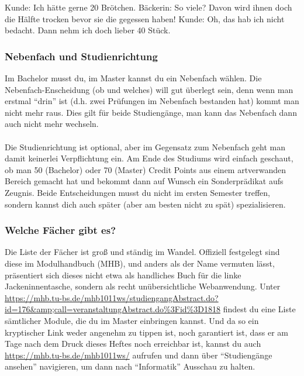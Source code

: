 Kunde: Ich hätte gerne 20 Brötchen. 
Bäckerin: So viele? Davon wird ihnen doch die Hälfte trocken bevor sie die gegessen haben!
Kunde: Oh, das hab ich nicht bedacht. Dann nehm ich doch lieber 40 Stück.

\subsubsection{Nebenfach und Studienrichtung}
\label{nebenfach}
Im Bachelor musst du, im Master kannst du ein Nebenfach wählen.
 Die Nebenfach-Enscheidung (ob und welches) will gut überlegt sein, denn wenn man
 erstmal "`drin"' ist (d.h. zwei Prüfungen im Nebenfach bestanden hat)
 kommt man nicht mehr raus. Dies gilt für beide Studiengänge, man kann
 das Nebenfach dann auch nicht mehr wechseln. \\\\
Die Studienrichtung ist  optional, aber im Gegensatz zum Nebenfach
geht man damit keinerlei Verpflichtung ein. Am Ende des Studiums wird
einfach geschaut, ob man 50 (Bachelor) oder 70 (Master) Credit Points
aus einem artverwanden Bereich gemacht hat und bekommt dann auf Wunsch
ein Sonderprädikat aufs Zeugnis. 
Beide Entscheidungen musst du nicht im ersten Semester treffen, sondern kannst dich auch später (aber am besten nicht zu spät) spezialisieren.

\subsubsection{Welche Fächer gibt es?}
Die Liste der Fächer ist groß und ständig im Wandel. Offiziell
festgelegt sind diese im Modulhandbuch (MHB), und anders als der Name
vermuten lässt, präsentiert sich dieses nicht etwa als handliches Buch
für die linke Jackeninnentasche, sondern als recht unübersichtliche
Webanwendung. Unter
\url{https://mhb.tu-bs.de/mhb1011ws/studiengangAbstract.do?id=176&amp;call=veranstaltungAbstract.do%3Fid%3D1818} 
findest du eine Liste sämtlicher Module, die du im Master einbringen kannst. Und da so ein kryptischer Link weder angenehm zu tippen ist, noch garantiert ist, dass er am Tage nach dem Druck dieses Heftes noch erreichbar ist, kannst du auch \url{https://mhb.tu-bs.de/mhb1011ws/} aufrufen und dann über "`Studiengänge ansehen"' navigieren, um dann nach "`Informatik"' Ausschau zu halten.

